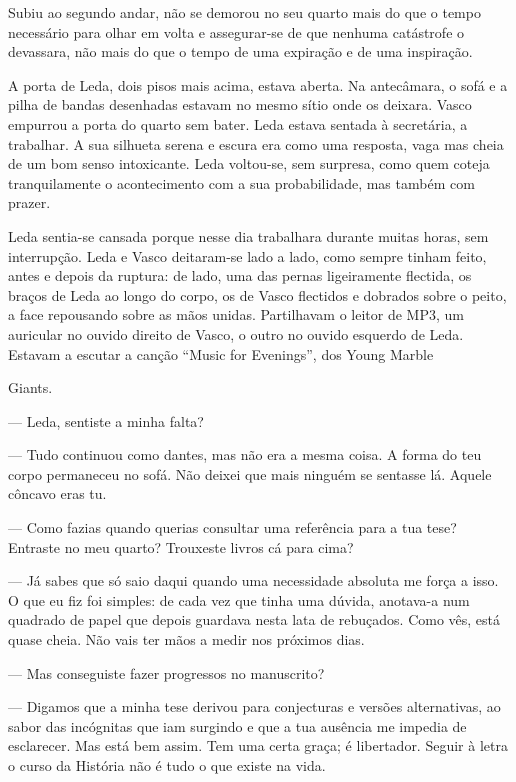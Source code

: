 Subiu ao segundo andar, não se demorou no seu quarto mais do que o tempo
necessário para olhar em volta e assegurar-se de que nenhuma
catástrofe o devassara, não mais do que o tempo de uma expiração e de
uma inspiração.

A porta de Leda, dois pisos mais acima, estava aberta. Na antecâmara, o
sofá e a pilha de bandas desenhadas estavam no mesmo sítio onde os
deixara. Vasco empurrou a porta do quarto sem bater. Leda estava sentada
à secretária, a trabalhar. A sua silhueta serena e escura era como uma
resposta, vaga mas cheia de um bom senso intoxicante. Leda voltou-se,
sem surpresa, como quem coteja tranquilamente o acontecimento com a sua
probabilidade, mas também com prazer.

Leda sentia-se cansada porque nesse dia trabalhara durante muitas
horas, sem interrupção. Leda e Vasco deitaram-se lado a lado, como
sempre tinham feito, antes e depois da ruptura: de lado, uma das pernas
ligeiramente flectida, os braços de Leda ao longo do corpo, os de Vasco
flectidos e dobrados sobre o peito, a face repousando sobre as mãos
unidas. Partilhavam o leitor de MP3, um auricular no ouvido direito de
Vasco, o outro no ouvido esquerdo de Leda. Estavam a escutar a canção
``Music for Evenings'', dos Young Marble

Giants.

--- Leda, sentiste a minha falta?

--- Tudo continuou como dantes, mas não era a mesma coisa. A forma do teu
  corpo permaneceu no sofá. Não deixei que mais ninguém se sentasse lá.
  Aquele côncavo eras tu.

--- Como fazias quando querias consultar uma referência para a tua tese?
  Entraste no meu quarto? Trouxeste livros cá para cima?

--- Já sabes que só saio daqui quando uma necessidade absoluta me força a
  isso. O que eu fiz foi simples: de cada vez que tinha uma dúvida,
  anotava-a num quadrado de papel que depois guardava nesta lata de
  rebuçados. Como vês, está quase cheia. Não vais ter mãos a medir nos
  próximos dias.

--- Mas conseguiste fazer progressos no manuscrito?

--- Digamos que a minha tese derivou para conjecturas e versões
  alternativas, ao sabor das incógnitas que iam surgindo e que a tua
  ausência me impedia de esclarecer. Mas está bem assim. Tem uma certa
  graça; é libertador. Seguir à letra o curso da História não é tudo o
  que existe na vida.

